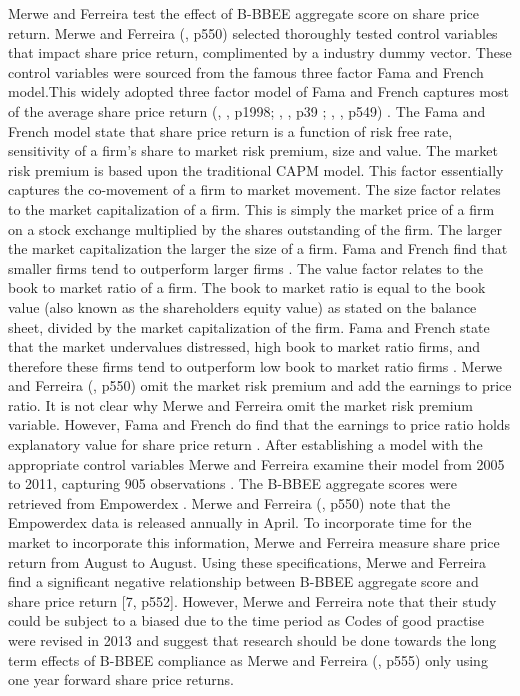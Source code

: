 Merwe and Ferreira test the effect of B-BBEE aggregate score on share price return. Merwe and Ferreira (\citeyear{N7}, p550) selected thoroughly tested control variables that impact share price return, complimented by a industry dummy vector. These control variables were sourced from the famous three factor Fama and French model.This widely adopted three factor model of Fama and French captures most of the average share price return (\citeauthor{N52}, \citeyear{N52}, p1998; \citeauthor{N53}, \citeyear{N53}, p39 ; \citeauthor{N7}, \citeyear{N7}, p549) . The Fama and French model state that share price return is a function of risk free rate, sensitivity of a firm’s share to market risk premium, size and value. The market risk premium is based upon the traditional CAPM model. This factor essentially captures the co-movement of a firm to market movement. The size factor relates to the market capitalization of a firm. This is simply the market price of a firm on a stock exchange multiplied by the shares outstanding of the firm. The larger the market capitalization the larger the size of a firm. Fama and French find that smaller firms tend to outperform larger firms \cite[p38]{N53}. The value factor relates to the book to market ratio of a firm. The book to market ratio is equal to the book value (also known as the shareholders equity value) as stated on the balance sheet, divided by the market capitalization of the firm. Fama and French state that the market undervalues distressed, high book to market ratio firms, and therefore these firms tend to outperform low book to market ratio firms \cite[p1975]{N52} . Merwe and Ferreira (\citeyear{N7}, p550) omit the market risk premium and add the earnings to price ratio. It is not clear why Merwe and Ferreira omit the market risk premium variable. However, Fama and French do find that the earnings to price ratio holds explanatory value for share price return \cite[p1997]{N52}. After establishing a model with the appropriate control variables Merwe and Ferreira examine their model from 2005 to 2011, capturing 905 observations \cite[p550-551]{N7}. The B-BBEE aggregate scores were retrieved from Empowerdex \cite[p550]{N7}. Merwe and Ferreira (\citeyear{N7}, p550) note that the Empowerdex data is released annually in April. To incorporate time for the market to incorporate this information, Merwe and Ferreira measure share price return from August to August. Using these specifications, Merwe and Ferreira find a significant negative relationship between B-BBEE aggregate score and share price return [7, p552]. However, Merwe and Ferreira note that their study could be subject to a biased due to the time period as Codes of good practise were revised in 2013 and suggest that research should be done towards the long term effects of B-BBEE compliance as Merwe and Ferreira (\citeyear{N7}, p555) only using one year forward share price returns.

